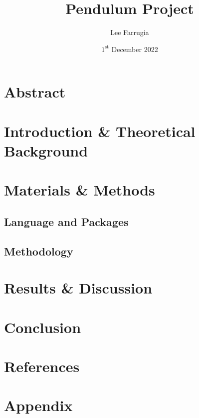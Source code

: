 \documentclass[12pt, a4paper]{article}
\title{Pendulum Project}
\date{\(1^\mathrm{{st}}\) December 2022}
\author{Lee Farrugia}
\begin{document}
    
\maketitle
\thispagestyle{titlepagestyle}
\pagestyle{mystyle}

\section{Abstract}

\section{Introduction \& Theoretical Background}

\section{Materials \& Methods}
\subsection{Language and Packages}

\subsection{Methodology}

\section{Results \& Discussion}

\section{Conclusion}

\section{References}
\printbibliography[heading = none]

\section{Appendix}
\begin{verbatim}

\end{verbatim}
\end{document}
